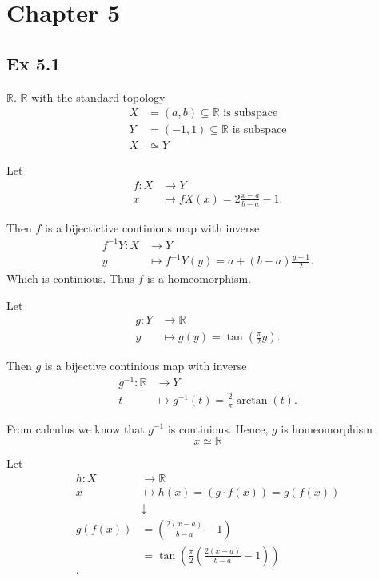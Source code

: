 \documentclass{article}
\theoremstyle{remark}
\begin{document}
\newpage
\section*{Chapter 5}%
\label{sec:chapter_5}

\subsection*{Ex 5.1}%
\label{sub:ex_5_1}

$\mathbb{R} $. $\mathbb{R} $  with the standard topology \[
\begin{split}
    X & = \left( a,b \right) \subseteq    \mathbb{R}  \text{  is subspace} \\
    Y &= \left( -1,1 \right) \subseteq    \mathbb{R} \text{ is subspace} \\
    X  &  \simeq   Y
\end{split}
\]

Let  \begin{align*}
    f:  X &\longrightarrow  Y \\
     x&\longmapsto fX(x) =2  \frac{ x-a }{b-a}  - 1
.\end{align*}

Then $f$  is a bijectictive continious map with inverse \begin{align*}
    f^{-1}Y: X &\longrightarrow Y \\
    y &\longmapsto f^{-1}Y(y) = a + \left( b-a \right) \frac{y+1}{2}
.\end{align*}
Which is continious. Thus $f$  is a homeomorphism.


Let \begin{align*}
    g: Y &\longrightarrow \mathbb{R}  \\
    y &\longmapsto g(y) = \tan \left( \frac{\pi}{2}  y \right)
.\end{align*}

Then $g$   is a bijective continious map with inverse \begin{align*}
    g^{-1}: \mathbb{R}  &\longrightarrow Y \\
     t &\longmapsto g^{-1}(t) = \frac{2}{\pi } \arctan \left( t \right)
.\end{align*}

From calculus we know that $g^{-1}$  is continious. Hence, $g$  is homeomorphism \[
x \simeq \mathbb{R}
\]

Let \begin{align*}
    h: X &\longrightarrow \mathbb{R}  \\
    x &\longmapsto h(x) = \left( g \cdot f\left( x \right) \right) = g\left( f\left( x \right) \right) \\
 &  \downarrow \\
    g\left( f\left( x \right) \right) &=  \left( \frac{2\left( x-a \right)}{b-a} -1  \right)  \\
    &= \tan \left( \frac{\pi }{2} \left( \frac{2\left( x-a \right)}{b-a} -1 \right) \right) \\
.\end{align*}
\end{document}
